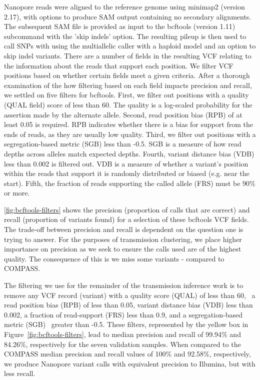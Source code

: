 Nanopore reads were aligned to the \mtb{} reference genome using minimap2 (version 2.17), with options to produce SAM output containing no secondary alignments. The subsequent SAM file is provided as input to the bcftools (version 1.11) subcommand  with the 'skip indels' option. The resulting pileup is then used to call SNPs with  using the multiallelic caller with a haploid model and an option to skip indel variants.
There are a number of fields in the resulting VCF relating to the information about the reads that support each position. We filter VCF positions based on whether certain fields meet a given criteria.
After a thorough examination of the how filtering based on each field impacts precision and recall, we settled on five filters for bcftools. First, we filter out positions with a quality (QUAL field) score of less than 60. The quality is a log-scaled probability for the assertion made by the alternate allele. Second, read position bias (RPB) of at least 0.05 is required. RPB indicates whether there is a bias for support from the ends of reads, as they are usually low quality. Third, we filter out positions with a segregation-based metric (SGB) less than -0.5. SGB is a measure of how read depths across alleles match expected depths. Fourth, variant distance bias (VDB) less than 0.002 is filtered out. VDB is a measure of whether a variant's position within the reads that support it is randomly distributed or biased (e.g. near the start). Fifth, the fraction of reads supporting the called allele (FRS) must be 90\% or more.

\autoref{fig:bcftools-filters} shows the precision (proportion
of calls that are correct) and recall (proportion of variants found) for
a selection of these bcftools VCF fields. The trade-off between
precision and recall is dependent on the question one is trying to
answer. For the purposes of transmission clustering, we place higher importance on
precision as we seek to ensure the calls used are of the highest
quality. The consequence of this is we miss some variants - compared to
COMPASS.

The filtering we use for the remainder of the transmission inference
work is to remove any VCF record (variant) with a quality score (QUAL)
of less than 60,~ a read position bias (RPB) of less than 0.05, variant
distance bias (VDB) less than 0.002, a fraction of read-support (FRS)
less than 0.9, and a segregation-based metric (SGB)~ greater than -0.5.
These filters, represented by the yellow box in
Figure~{\ref{fig:bcftools-filters}}, lead to median precision and
recall of 99.94\% and 84.26\%, respectively for the seven validation
samples. When compared to the COMPASS median precision and recall values
of 100\% and 92.58\%, respectively,~ we produce Nanopore variant calls
with equivalent precision to Illumina, but with less recall.

